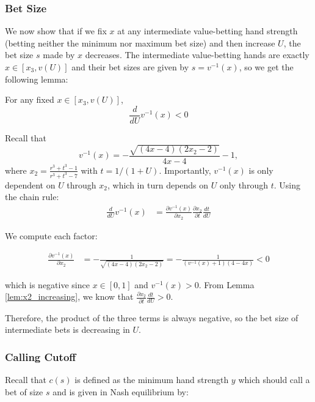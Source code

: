 \documentclass[../../main/main.tex]{subfiles}
\begin{document}
\subsubsection{Bet Size}

We now show that if we fix $x$ at any intermediate value-betting hand strength (betting neither the minimum nor maximum bet size) and then increase $U$, the bet size $s$ made by $x$ decreases. The intermediate value-betting hands are exactly $x \in [x_3, v(U)]$ and their bet sizes are given by $s = v^{-1}(x)$, so we get the following lemma:

\begin{lemma}
    \label{lem:v_inverse_decreasing}
    For any fixed $x \in [x_3, v(U)]$,
    \[
        \frac{d}{dU} v^{-1}(x) < 0
    \]
\end{lemma}

\begin{customproof}
    Recall that
    $$v^{-1}(x) = -\frac{\sqrt{(4 x-4) (2 x_2-2)}}{4 x-4}-1,$$
    where $x_2 = \frac{r^3 + t^3 - 1}{r^3 + t^3 - 7}$ with $t = 1/(1+U)$. Importantly, $v^{-1}(x)$ is only dependent on $U$ through $x_2$, which in turn depends on $U$ only through $t$. Using the chain rule:
    \begin{align*}
        \frac{d}{dU} v^{-1}(x) & = \frac{\partial v^{-1}(x)}{\partial x_2} \frac{\partial x_2}{\partial t} \frac{dt}{dU}
    \end{align*}

    We compute each factor:

\begin{align*}
    \frac{\partial v^{-1}(x)}{\partial x_2} & = - \frac{1}{\sqrt{(4 x-4) (2 x_2-2)}} = - \frac{1}{(v^{-1}(x)+1)(4-4x)} < 0
\end{align*}

    which is negative since $x \in [0, 1]$ and $v^{-1}(x) >0$. From Lemma \ref{lem:x2_increasing}, we know that $\frac{\partial x_2}{\partial t} \frac{dt}{dU} > 0$.

    Therefore, the product of the three terms is always negative, so the bet size of intermediate bets is decreasing in $U$.
\end{customproof}

\subsubsection{Calling Cutoff}

Recall that $c(s)$ is defined as the minimum hand strength $y$ which should call a bet of size $s$ and is given in Nash equilibrium by:
\end{document}
